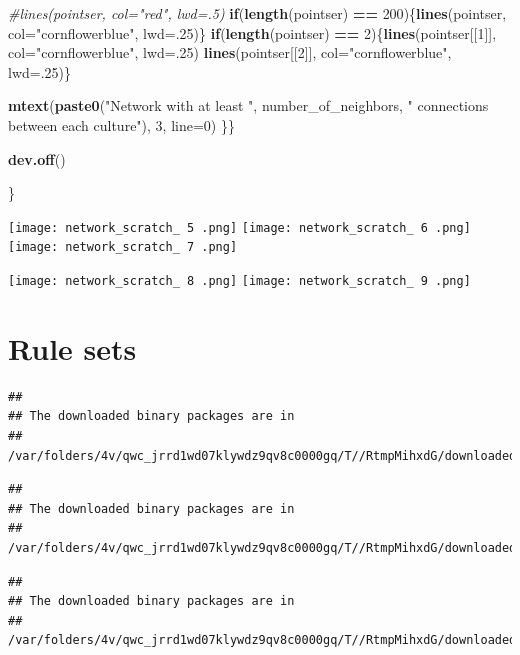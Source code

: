 \documentclass[]{book}
\newenvironment{Shaded}{\begin{snugshade}}{\end{snugshade}}
\newcommand{\KeywordTok}[1]{\textcolor[rgb]{0.13,0.29,0.53}{\textbf{{#1}}}}
\newcommand{\DataTypeTok}[1]{\textcolor[rgb]{0.13,0.29,0.53}{{#1}}}
\newcommand{\DecValTok}[1]{\textcolor[rgb]{0.00,0.00,0.81}{{#1}}}
\newcommand{\StringTok}[1]{\textcolor[rgb]{0.31,0.60,0.02}{{#1}}}
\newcommand{\CommentTok}[1]{\textcolor[rgb]{0.56,0.35,0.01}{\textit{{#1}}}}
\newcommand{\ControlFlowTok}[1]{\textcolor[rgb]{0.13,0.29,0.53}{\textbf{{#1}}}}
\newcommand{\OperatorTok}[1]{\textcolor[rgb]{0.81,0.36,0.00}{\textbf{{#1}}}}
\newcommand{\NormalTok}[1]{{#1}}
\theoremstyle{definition}
\theoremstyle{definition}
\theoremstyle{definition}
\theoremstyle{remark}
\begin{document}
\begin{Shaded}
\begin{Highlighting}[]
    \CommentTok{#lines(pointser, col="red", lwd=.5)}
\ControlFlowTok{if}\NormalTok{(}\KeywordTok{length}\NormalTok{(pointser) }\OperatorTok{==}\StringTok{ }\DecValTok{200}\NormalTok{)\{}\KeywordTok{lines}\NormalTok{(pointser, }\DataTypeTok{col=}\StringTok{"cornflowerblue"}\NormalTok{, }\DataTypeTok{lwd=}\NormalTok{.}\DecValTok{25}\NormalTok{)\}}
\ControlFlowTok{if}\NormalTok{(}\KeywordTok{length}\NormalTok{(pointser) }\OperatorTok{==}\StringTok{ }\DecValTok{2}\NormalTok{)\{}\KeywordTok{lines}\NormalTok{(pointser[[}\DecValTok{1}\NormalTok{]], }\DataTypeTok{col=}\StringTok{"cornflowerblue"}\NormalTok{, }\DataTypeTok{lwd=}\NormalTok{.}\DecValTok{25}\NormalTok{)}
    \KeywordTok{lines}\NormalTok{(pointser[[}\DecValTok{2}\NormalTok{]], }\DataTypeTok{col=}\StringTok{"cornflowerblue"}\NormalTok{, }\DataTypeTok{lwd=}\NormalTok{.}\DecValTok{25}\NormalTok{)\}}
    

    \KeywordTok{mtext}\NormalTok{(}\KeywordTok{paste0}\NormalTok{(}\StringTok{"Network with at least "}\NormalTok{, number_of_neighbors, }\StringTok{" connections between each culture"}\NormalTok{), }\DecValTok{3}\NormalTok{, }\DataTypeTok{line=}\DecValTok{0}\NormalTok{)}
\NormalTok{\}\}}

\KeywordTok{dev.off}\NormalTok{()}


\NormalTok{\}}
\end{Highlighting}
\end{Shaded}

\texttt{[image: network\_scratch\_ 5 .png]}
\texttt{[image: network\_scratch\_ 6 .png]}
\texttt{[image: network\_scratch\_ 7 .png]}

\texttt{[image: network\_scratch\_ 8 .png]}
\texttt{[image: network\_scratch\_ 9 .png]}

\chapter{Rule sets}\label{rule-sets}

\begin{verbatim}
## 
## The downloaded binary packages are in
##  /var/folders/4v/qwc_jrrd1wd07klywdz9qv8c0000gq/T//RtmpMihxdG/downloaded_packages
\end{verbatim}

\begin{verbatim}
## 
## The downloaded binary packages are in
##  /var/folders/4v/qwc_jrrd1wd07klywdz9qv8c0000gq/T//RtmpMihxdG/downloaded_packages
\end{verbatim}

\begin{verbatim}
## 
## The downloaded binary packages are in
##  /var/folders/4v/qwc_jrrd1wd07klywdz9qv8c0000gq/T//RtmpMihxdG/downloaded_packages
\end{verbatim}
\end{document}
